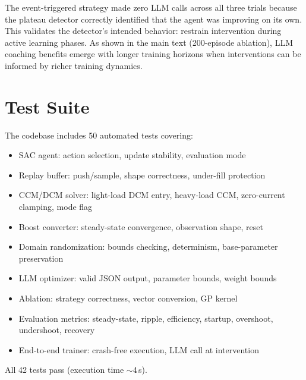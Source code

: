 \documentclass[11pt]{article}
\begin{document}
The event-triggered strategy made zero LLM calls across all three trials because
the plateau detector correctly identified that the agent was improving on its own.
This validates the detector's intended behavior: restrain intervention during
active learning phases. As shown in the main text (200-episode ablation), LLM
coaching benefits emerge with longer training horizons when interventions can be
informed by richer training dynamics.

\section{Test Suite}

The codebase includes 50 automated tests covering:
\begin{itemize}
    \item SAC agent: action selection, update stability, evaluation mode
    \item Replay buffer: push/sample, shape correctness, under-fill protection
    \item CCM/DCM solver: light-load DCM entry, heavy-load CCM, zero-current clamping, mode flag
    \item Boost converter: steady-state convergence, observation shape, reset
    \item Domain randomization: bounds checking, determinism, base-parameter preservation
    \item LLM optimizer: valid JSON output, parameter bounds, weight bounds
    \item Ablation: strategy correctness, vector conversion, GP kernel
    \item Evaluation metrics: steady-state, ripple, efficiency, startup, overshoot, undershoot, recovery
    \item End-to-end trainer: crash-free execution, LLM call at intervention
\end{itemize}

All 42 tests pass (execution time $\sim$4\,s).
\end{document}
